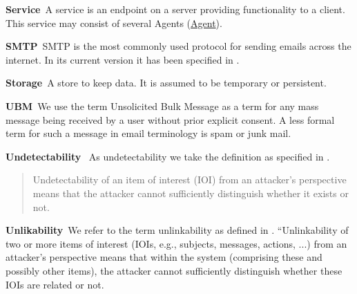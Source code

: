 \documentclass[a4paper,appendixprefix,pdfusetitle,twocolumn,fontsize=8pt,draft,DIV=calc]{scrbook}
\newenvironment{entry}{\par\leavevmode\hangpara{1.5mm}{1}\ignorespaces}{\RaggedRight\par}
\newcommand*{\mainentry}[2]{{\bfseries{#1\label{def:#1}}}~#2\par}
\newcommand*{\defref}[1]{\hyperref[def:#1]{#1}}
\begin{document}
\begin{entry}
	\mainentry{Service}{A service is an endpoint on a server providing functionality to a client. This service may consist of several Agents (\defref{Agent}).}
\end{entry}

\begin{entry}
	\mainentry{SMTP}{SMTP is the most commonly used protocol for sending emails across the internet. In its current version it has been specified in \cite{RFC5321}.}
\end{entry}

\begin{entry}
	\mainentry{Storage}{A store to keep data. It is assumed to be temporary or persistent.}
\end{entry}

\begin{entry}
	\mainentry{UBM}{We use the term Unsolicited Bulk Message as a term for any mass message being received by a user without prior explicit consent. A less formal term for such a message in email terminology is spam or junk mail.}
\end{entry}

\begin{entry}
	\mainentry{Undetectability}{
		As undetectability we take the definition as specified in \cite{anonTerminology}.
		\begin{quote}
			Undetectability of an item of interest (IOI\index{Item of Interest}) from an attacker's perspective means that the
			attacker cannot sufficiently distinguish whether it exists or not.\omitted
		\end{quote}
	}
\end{entry}

\begin{entry}
	\mainentry{Unlikability}{We refer to the term unlinkability as defined in \cite{anonTerminology}. ``Unlinkability of two or more items of interest (IOIs, e.g., subjects, messages, actions, ...) from an attacker’s perspective means that within the system (comprising these and possibly other items), the attacker cannot sufficiently distinguish whether these IOIs are 
		related or not.}
\end{entry}
\end{document}
